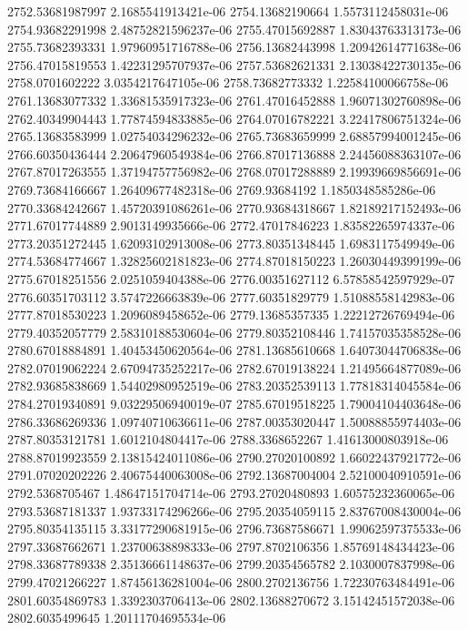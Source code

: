 {2752.53681987997 2.1685541913421e-06
2754.13682190664 1.5573112458031e-06
2754.93682291998 2.48752821596237e-06
2755.47015692887 1.83043763313173e-06
2755.73682393331 1.97960951716788e-06
2756.13682443998 1.20942614771638e-06
2756.47015819553 1.42231295707937e-06
2757.53682621331 2.13038422730135e-06
2758.0701602222 3.0354217647105e-06
2758.73682773332 1.22584100066758e-06
2761.13683077332 1.33681535917323e-06
2761.47016452888 1.96071302760898e-06
2762.40349904443 1.77874594833885e-06
2764.07016782221 3.22417806751324e-06
2765.13683583999 1.02754034296232e-06
2765.73683659999 2.68857994001245e-06
2766.60350436444 2.20647960549384e-06
2766.87017136888 2.24456088363107e-06
2767.87017263555 1.37194757756982e-06
2768.07017288889 2.19939669856691e-06
2769.73684166667 1.26409677482318e-06
2769.93684192 1.1850348585286e-06
2770.33684242667 1.45720391086261e-06
2770.93684318667 1.82189217152493e-06
2771.67017744889 2.9013149935666e-06
2772.47017846223 1.83582265974337e-06
2773.20351272445 1.62093102913008e-06
2773.80351348445 1.6983117549949e-06
2774.53684774667 1.32825602181823e-06
2774.87018150223 1.26030449399199e-06
2775.67018251556 2.0251059404388e-06
2776.00351627112 6.57858542597929e-07
2776.60351703112 3.5747226663839e-06
2777.60351829779 1.51088558142983e-06
2777.87018530223 1.2096089458652e-06
2779.13685357335 1.22212726769494e-06
2779.40352057779 2.58310188530604e-06
2779.80352108446 1.74157035358528e-06
2780.67018884891 1.40453450620564e-06
2781.13685610668 1.64073044706838e-06
2782.07019062224 2.67094735252217e-06
2782.67019138224 1.21495664877089e-06
2782.93685838669 1.54402980952519e-06
2783.20352539113 1.77818314045584e-06
2784.27019340891 9.03229506940019e-07
2785.67019518225 1.79004104403648e-06
2786.33686269336 1.09740710636611e-06
2787.00353020447 1.50088855974403e-06
2787.80353121781 1.6012104804417e-06
2788.3368652267 1.41613000803918e-06
2788.87019923559 2.13815424011086e-06
2790.27020100892 1.66022437921772e-06
2791.07020202226 2.40675440063008e-06
2792.13687004004 2.52100040910591e-06
2792.5368705467 1.48647151704714e-06
2793.27020480893 1.60575232360065e-06
2793.53687181337 1.93733174296266e-06
2795.20354059115 2.83767008430004e-06
2795.80354135115 3.33177290681915e-06
2796.73687586671 1.99062597375533e-06
2797.33687662671 1.23700638898333e-06
2797.8702106356 1.85769148434423e-06
2798.33687789338 2.35136661148637e-06
2799.20354565782 2.1030007837998e-06
2799.47021266227 1.87456136281004e-06
2800.2702136756 1.72230763484491e-06
2801.60354869783 1.3392303706413e-06
2802.13688270672 3.15142451572038e-06
2802.6035499645 1.20111704695534e-06
}
